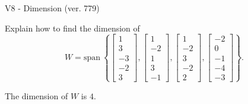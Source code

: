 \begin{exercise}
  \begin{exerciseTitle}V8 - Dimension (ver. 779)\end{exerciseTitle}
  \begin{exerciseStatement}
    Explain how to find the dimension of 
\[W=\mathrm{span}\ \left\{\left[\begin{array}{r}
1 \\
3 \\
-3 \\
-2 \\
3
\end{array}\right] , \left[\begin{array}{r}
1 \\
-2 \\
1 \\
3 \\
-1
\end{array}\right] , \left[\begin{array}{r}
1 \\
-2 \\
3 \\
-2 \\
2
\end{array}\right] , \left[\begin{array}{r}
-2 \\
0 \\
-1 \\
-4 \\
-3
\end{array}\right]\right\}.\]



  \end{exerciseStatement}
  \begin{exerciseAnswer}
   The dimension of \(W\) is  \(4\).
  


  \end{exerciseAnswer}
\end{exercise}